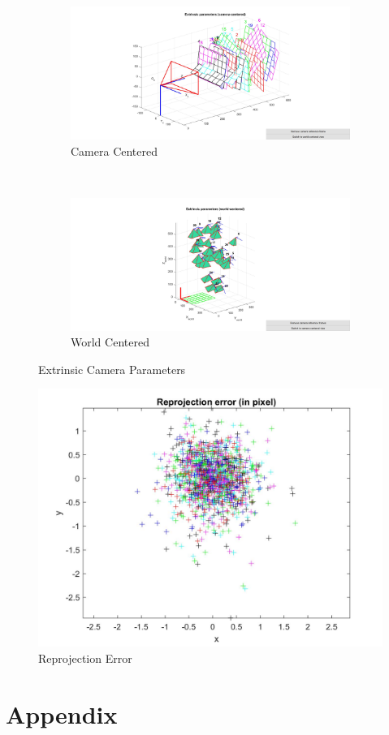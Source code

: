 \documentclass[paper=a4, fontsize=11pt]{scrartcl} %
\numberwithin{equation}{section} %
\numberwithin{figure}{section} %
\numberwithin{table}{section} %
\begin{document}
\begin{figure}[H]
    \centering
    \begin{subfigure}[b]{0.45\textwidth}
        \includegraphics[width=\textwidth]{extrinsic_01.jpg}
        \caption{Camera Centered}
        \label{fig:extrinsic01}
    \end{subfigure}
    ~ %
    \begin{subfigure}[b]{0.45\textwidth}
        \includegraphics[width=\textwidth]{extrinsic_02}
        \caption{World Centered}
        \label{fig:extrinsic02}
    \end{subfigure}
    \caption{Extrinsic Camera Parameters}\label{fig:extrinsic}
\end{figure}

\begin{figure}[H]
	\centering
	\includegraphics[width = 0.6\linewidth]{error.jpg}
	\caption{Reprojection Error}
	\label{ref_error}
\end{figure}


\section{Appendix}
\label{ref_appendix}




\end{document}
